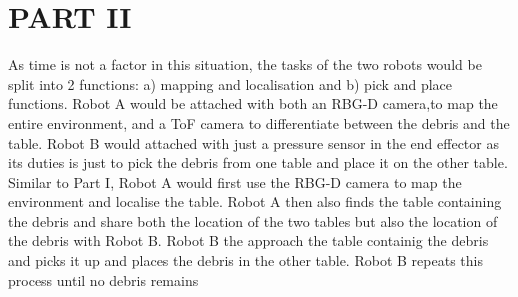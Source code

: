 \documentclass[letterpaper, 10 pt, conference]{ieeeconf}  %
\begin{document}
\section*{PART II}
As time is not a factor in this situation, the tasks of the two robots would be split into 2 functions: a) mapping and localisation and b) pick and place functions. Robot A would be attached with both an RBG-D camera,to map the entire environment, and a ToF camera to differentiate between the debris and the table. Robot B would attached with just a pressure sensor in the end effector as its duties is just to pick the debris from one table and place it on the other table. Similar to Part I, Robot A would first use the RBG-D camera to map the environment and localise the table. Robot A then also finds the table containing the debris and share both the location of the two tables but also the location of the debris with Robot B. Robot B the approach the table containig the debris and picks it up and places the debris in the other table. Robot B repeats this process until no debris remains



\end{document}
